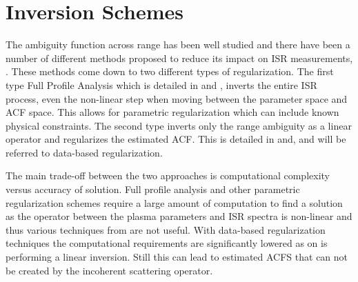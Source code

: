 %
%
%
%
%
\section{Inversion Schemes}
\label{sec:isrlit}
The ambiguity function across range has been well studied and there have been a number of different methods proposed to reduce its impact on ISR measurements,
\citep{RDS:RDS3308,hysell2008,nikoukar2008,Virtanen:20082vx}. These methods come down to two different types of regularization. The first type Full Profile Analysis which is detailed in \citep{RDS:RDS3308} and \citep{hysell2008}, inverts the entire ISR process, even the non-linear step when moving between the parameter space and ACF space. This allows for parametric regularization which can include known physical constraints. The second type inverts only the range ambiguity as a linear operator and regularizes the estimated ACF. This is detailed in \citep{nikoukar2008} and\citep{Virtanen:20082vx}, and will be referred to data-based regularization.

The main trade-off between the two approaches is computational complexity versus accuracy of solution. Full profile analysis and other parametric regularization schemes require a large amount of computation to find a solution as the operator between the plasma parameters and ISR spectra is non-linear and thus various techniques from are not useful. With data-based regularization techniques the computational requirements are significantly lowered as on is performing a linear inversion. Still this can lead to estimated ACFS that can not be created by the incoherent scattering operator.


